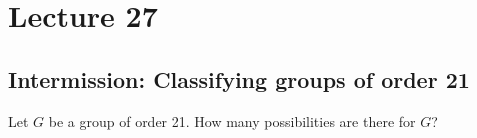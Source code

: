 \section{Lecture 27}
\subsection{Intermission: Classifying groups of order 21}
\begin{example}
  Let $G$ be a group of order 21. How many possibilities are there for $G$?
\end{example}



